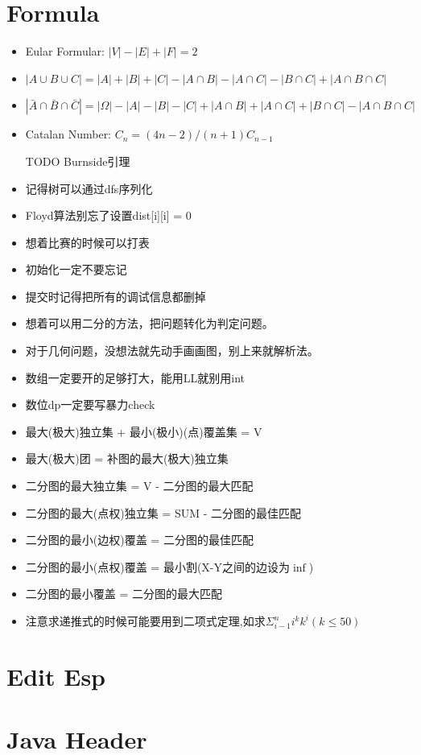 \documentclass[
	10pt,
	twocolumn,
	a4paper,
]{article}
\begin{document}
\section{Formula}
\begin{itemize} 
\setlength{\itemsep}{0pt}
\item Eular Formular: $|V| - |E| + |F| = 2$
\item $|A \cup B \cup C | = |A| + |B| + |C| - |A \cap B| - |A \cap C| - |B \cap C| + |A \cap B \cap C|$
\item $|\bar A \cap \bar B \cap \bar C | = |\Omega| - |A| - |B| - |C| + |A \cap B| + |A \cap C| + |B \cap C| - |A \cap B \cap C| $
\item Catalan Number: $C_n = (4n-2) / (n+1) C_{n-1}$
\item [TODO]Burnside引理
\item 记得树可以通过dfs序列化
\item Floyd算法别忘了设置dist[i][i] = 0
\item 想着比赛的时候可以打表
\item 初始化一定不要忘记
\item 提交时记得把所有的调试信息都删掉
\item 想着可以用二分的方法，把问题转化为判定问题。
\item 对于几何问题，没想法就先动手画画图，别上来就解析法。
\item 数组一定要开的足够打大，能用LL就别用int
\item 数位dp一定要写暴力check
\item 最大(极大)独立集 + 最小(极小)(点)覆盖集 = V
\item 最大(极大)团 = 补图的最大(极大)独立集
\item 二分图的最大独立集 = V - 二分图的最大匹配
\item 二分图的最大(点权)独立集 = SUM - 二分图的最佳匹配
\item 二分图的最小(边权)覆盖 = 二分图的最佳匹配
\item 二分图的最小(点权)覆盖 = 最小割(X-Y之间的边设为$\inf$)
\item 二分图的最小覆盖 = 二分图的最大匹配
\item 注意求递推式的时候可能要用到二项式定理,如求$ \Sigma_{i-1}^n{i^k k^i} (k \le 50) $
\end{itemize} 

\section{Edit Esp}

\section{Java Header}

\end{document}
